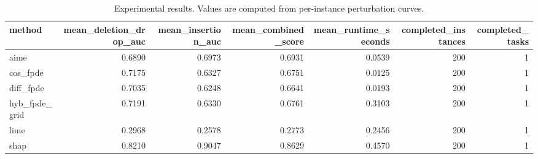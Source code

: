 \begin{table}[t]
\caption{Experimental results. Values are computed from per-instance perturbation curves.}
\label{tab:main_results_computed}
\centering
\begin{tabular}{lrrrrrr}
\toprule
method & mean\_deletion\_drop\_auc & mean\_insertion\_auc & mean\_combined\_score & mean\_runtime\_seconds & completed\_instances & completed\_tasks \\
\midrule
aime & 0.6890 & 0.6973 & 0.6931 & 0.0539 & 200 & 1 \\
cos\_fpde & 0.7175 & 0.6327 & 0.6751 & 0.0125 & 200 & 1 \\
diff\_fpde & 0.7035 & 0.6248 & 0.6641 & 0.0193 & 200 & 1 \\
hyb\_fpde\_grid & 0.7191 & 0.6330 & 0.6761 & 0.3103 & 200 & 1 \\
lime & 0.2968 & 0.2578 & 0.2773 & 0.2456 & 200 & 1 \\
shap & 0.8210 & 0.9047 & 0.8629 & 0.4570 & 200 & 1 \\
\bottomrule
\end{tabular}

\end{table}

